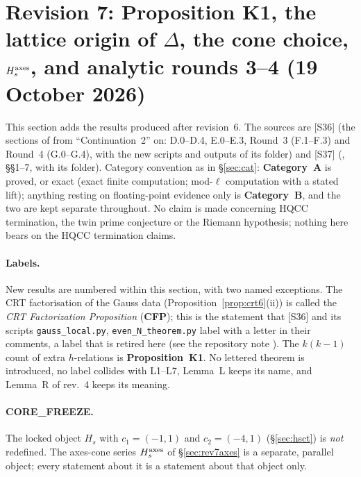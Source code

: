 \section[Revision 7: Proposition K1, origin of $\Delta$, cone choice, $H_s^{\rm axes}$, analytic rounds 3--4]{Revision 7: Proposition K1, the lattice origin of $\Delta$, the cone choice, $H_s^{\rm axes}$, and analytic rounds 3--4 (19 October 2026)}\label{sec:rev7}
This section adds the results produced after revision~6. The sources are [S36] (the sections of  from ``Continuation~2'' on: D.0--D.4, E.0--E.3, Round~3 (F.1--F.3) and Round~4 (G.0--G.4), with the new scripts and outputs of its folder) and [S37] (, \S\S1--7, with its folder).
Category convention as in \S\ref{sec:cat}: \textbf{Category~A} is proved, or exact (exact finite computation; mod-$\ell$ computation with a stated lift); anything resting on floating-point evidence only is \textbf{Category~B}, and the two are kept separate throughout. No claim is made concerning HQCC termination, the twin prime conjecture or the Riemann hypothesis; nothing here bears on the HQCC termination claims.

\paragraph{Labels.} New results are numbered within this section, with two named exceptions. The CRT factorisation of the Gauss data (Proposition~\ref{prop:crt6}(ii)) is called the \emph{CRT Factorization Proposition} (\textbf{CFP}); this is the statement that [S36] and its scripts \texttt{gauss\_local.py}, \texttt{even\_N\_theorem.py} label with a letter in their comments, a label that is retired here (see the repository note ). The $k(k-1)$ count of extra $h$-relations is \textbf{Proposition~K1}. No lettered theorem is introduced, no label collides with L1--L7, Lemma~L keeps its name, and Lemma~R of rev.~4 keeps its meaning.

\paragraph{CORE\_FREEZE.} The locked object $H_s$ with $c_1=(-1,1)$ and $c_2=(-4,1)$ (\S\ref{sec:hsct}) is \emph{not} redefined. The axes-cone series $H_s^{\rm axes}$ of \S\ref{sec:rev7axes} is a separate, parallel object; every statement about it is a statement about that object only.

